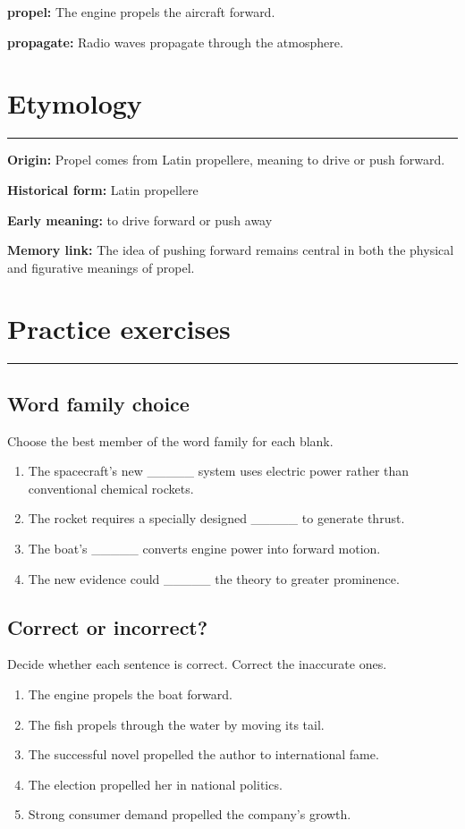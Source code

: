 \documentclass[11pt]{article}
\newcommand{\sectionrule}{\par\vspace{-0.5em}\noindent\textcolor{Accent}{\rule{\linewidth}{0.6pt}}\par}
\begin{document}
\textbf{propel:} The engine propels the aircraft forward.

\textbf{propagate:} Radio waves propagate through the atmosphere.

\section{Etymology}
\sectionrule
\textbf{Origin:} Propel comes from Latin propellere, meaning to drive or push forward.

\textbf{Historical form:} Latin propellere

\textbf{Early meaning:} to drive forward or push away

\textbf{Memory link:} The idea of pushing forward remains central in both the physical and figurative meanings of propel.

\section{Practice exercises}
\sectionrule
\subsection{Word family choice}
Choose the best member of the word family for each blank.

\begin{enumerate}
  \item The spacecraft's new \_\_\_\_\_ system uses electric power rather than conventional chemical rockets.
  \item The rocket requires a specially designed \_\_\_\_\_ to generate thrust.
  \item The boat's \_\_\_\_\_ converts engine power into forward motion.
  \item The new evidence could \_\_\_\_\_ the theory to greater prominence.
\end{enumerate}

\subsection{Correct or incorrect?}
Decide whether each sentence is correct. Correct the inaccurate ones.

\begin{enumerate}
  \item The engine propels the boat forward.
  \item The fish propels through the water by moving its tail.
  \item The successful novel propelled the author to international fame.
  \item The election propelled her in national politics.
  \item Strong consumer demand propelled the company's growth.
\end{enumerate}
\end{document}
